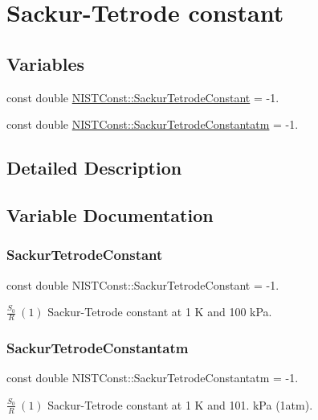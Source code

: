 \hypertarget{group___n_i_s_t_const-_sackur_tetrode_constant}{}\section{Sackur-\/\+Tetrode constant}
\label{group___n_i_s_t_const-_sackur_tetrode_constant}
\subsection*{Variables}
\begin{DoxyCompactItemize}
\item 
const double \mbox{\hyperlink{group___n_i_s_t_const-_sackur_tetrode_constant_gabd9928304da228b5f9c482aa488ea6bd}{N\+I\+S\+T\+Const\+::\+Sackur\+Tetrode\+Constant}} = -\/1.
\item 
const double \mbox{\hyperlink{group___n_i_s_t_const-_sackur_tetrode_constant_ga476418a3565db707ed30de46c3126220}{N\+I\+S\+T\+Const\+::\+Sackur\+Tetrode\+Constantatm}} = -\/1.
\end{DoxyCompactItemize}


\subsection{Detailed Description}


\subsection{Variable Documentation}
\mbox{\label{group___n_i_s_t_const-_sackur_tetrode_constant_gabd9928304da228b5f9c482aa488ea6bd}} 
\subsubsection{\texorpdfstring{Sackur\+Tetrode\+Constant}{SackurTetrodeConstant}}
{\footnotesize\ttfamily const double N\+I\+S\+T\+Const\+::\+Sackur\+Tetrode\+Constant = -\/1.}

$\frac{S_0}{R} \ (1)$ Sackur-\/\+Tetrode constant at 1 K and 100 k\+Pa. \mbox{\label{group___n_i_s_t_const-_sackur_tetrode_constant_ga476418a3565db707ed30de46c3126220}} 
\subsubsection{\texorpdfstring{Sackur\+Tetrode\+Constantatm}{SackurTetrodeConstantatm}}
{\footnotesize\ttfamily const double N\+I\+S\+T\+Const\+::\+Sackur\+Tetrode\+Constantatm = -\/1.}

$\frac{S_0}{R} \ (1)$ Sackur-\/\+Tetrode constant at 1 K and 101. k\+Pa (1atm). 